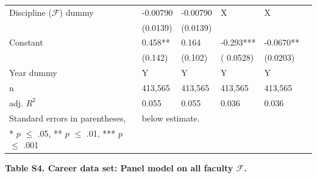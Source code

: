 \documentclass{article}\usepackage[]{graphicx}\usepackage[]{color}
\begin{document}
\begin{table}[h!]
\begin{center}
{\begin{tabular}{l l l l l l }
    
    \hline
    
    \rowcolor{gray!33} 
    Discipline ($\mathscr{F}$) dummy 
    
    &  -0.00790          & -0.00790          & X           & X                     \\
    {} 
    &  (0.0139)           & (0.0139)           &             &                     \\
    
    \rowcolor{gray!33} 
    Constant 
    & 0.458** &   0.164    & -0.293***   & -0.0670**    \\
    {} 
    & (0.142)  &  (0.102)    & ( 0.0528)   & (0.0203)              \\
    
    \rowcolor{gray!33} 
    Year dummy 
    & Y &   Y     & Y   & Y    \\
    
    \hline
    
     \rowcolor{gray!33} 
     n 
     & 413,565 &   413,565     & 413,565   & 413,565    \\
     
     \rowcolor{gray!33}
     adj. ${R^2}$ 
     & 0.055 & 0.055 & 0.036 & 0.036  \\
    
    \hline
    \hline
    
    Standard errors in parentheses, & \multicolumn{5}{l}{ below  estimate.} \\
    {* $\textit{p}$ $\leq$ .05, ** $\textit{p}$ $\leq$ .01, *** $\textit{p}$ $\leq$ .001}
    
  \end{tabular}%
  }
  \end{center}
\end{table}

\begin{center}
\par{\textbf{Table S4. Career data set: Panel model on all faculty $\mathscr{F}$.}}
\end{center}

\newpage
\end{document}
